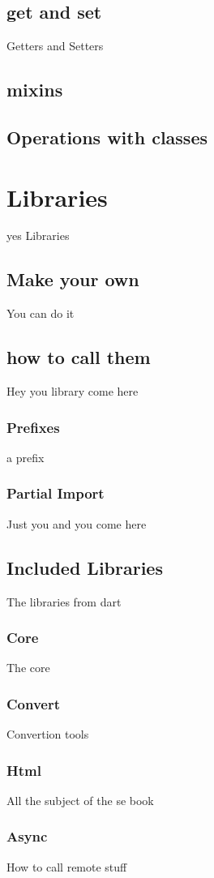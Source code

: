 \documentclass[10pt]{book}
\begin{document}
\subsection{get and set}
Getters and Setters
\subsection{mixins}
\subsection{Operations with classes}

\section{Libraries}
yes Libraries
\subsection{Make your own}
You can do it
\subsection{how to call them}
Hey you library come here
\subsubsection{Prefixes}
a prefix
\subsubsection{Partial Import}
Just you and you come here
\subsection{Included Libraries}
The libraries from dart
\subsubsection{Core}
The core
\subsubsection{Convert}
Convertion tools
\subsubsection{Html}
All the subject of the se book
\subsubsection{Async}
How to call remote stuff
\end{document}
